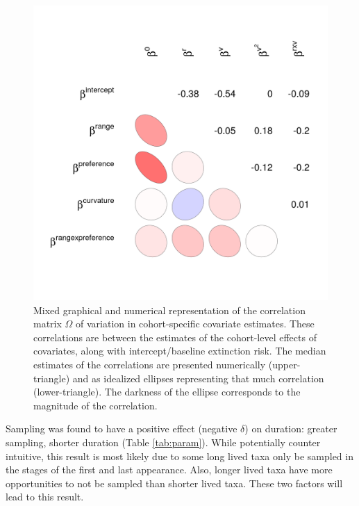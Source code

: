 \documentclass[11pt]{article}
\begin{document}
\begin{figure}[ht]
  \centering
  \includegraphics[height = 0.8\textheight,width=\textwidth,keepaspectratio=true]{figure/wei_cor_heatmap_cweib_cens}
  \caption{Mixed graphical and numerical representation of the correlation matrix \(\Omega\) of variation in cohort-specific covariate estimates. These correlations are between the estimates of the cohort-level effects of covariates, along with intercept/baseline extinction risk. The median estimates of the correlations are presented numerically (upper-triangle) and as idealized ellipses representing that much correlation (lower-triangle). The darkness of the ellipse corresponds to the magnitude of the correlation.}
  \label{fig:cor_posterior}
\end{figure}


Sampling was found to have a positive effect (negative \(\delta\)) on duration: greater sampling, shorter duration (Table \ref{tab:param}). While potentially counter intuitive, this result is most likely due to some long lived taxa only be sampled in the stages of the first and last appearance. Also, longer lived taxa have more opportunities to not be sampled than shorter lived taxa. These two factors will lead to this result. 
\end{document}
